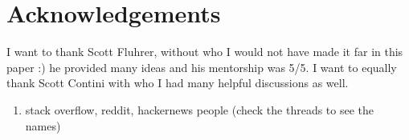 \documentclass[a4paper,11pt,twocolumn]{article}
\begin{document}
\newpage

\section*{Acknowledgements}

I want to thank Scott Fluhrer, without who I would not have made it far in this paper :) he provided many ideas and his mentorship was 5/5. I want to equally thank Scott Contini with who I had many helpful discussions as well.

\begin{enumerate}
    \item stack overflow, reddit, hackernews people (check the threads to see the names)
\end{enumerate}

\newpage
\end{document}
